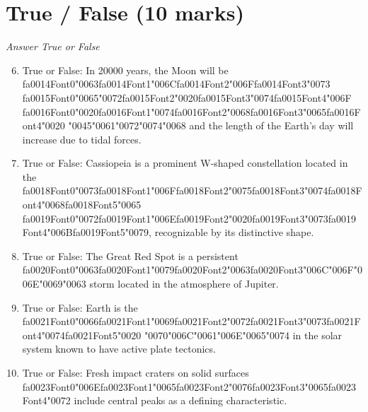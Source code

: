 \documentclass[12pt]{article}
\begin{document}
\section*{True / False (10 marks)}
\textit{Answer True or False}
\begin{enumerate}[label=\arabic*.]
\setcounter{enumi}{5}
\item True or False: In 20000 years, the Moon will be {\csname fa0014Font0\endcsname\char"0063}{\csname fa0014Font1\endcsname\char"006C}{\csname fa0014Font2\endcsname\char"006F}{\csname fa0014Font3\endcsname\char"0073} {\csname fa0015Font0\endcsname\char"0065}{\char"0072}{\csname fa0015Font2\endcsname\char"0020}{\csname fa0015Font3\endcsname\char"0074}{\csname fa0015Font4\endcsname\char"006F} {\csname fa0016Font0\endcsname\char"0020}{\csname fa0016Font1\endcsname\char"0074}{\csname fa0016Font2\endcsname\char"0068}{\csname fa0016Font3\endcsname\char"0065}{\csname fa0016Font4\endcsname\char"0020} {\char"0045}{\char"0061}{\char"0072}{\char"0074}{\char"0068} and the length of the Earth's day will increase due to tidal forces.
\item True or False: Cassiopeia is a prominent W-shaped constellation located in the {\csname fa0018Font0\endcsname\char"0073}{\csname fa0018Font1\endcsname\char"006F}{\csname fa0018Font2\endcsname\char"0075}{\csname fa0018Font3\endcsname\char"0074}{\csname fa0018Font4\endcsname\char"0068}{\csname fa0018Font5\endcsname\char"0065} {\csname fa0019Font0\endcsname\char"0072}{\csname fa0019Font1\endcsname\char"006E}{\csname fa0019Font2\endcsname\char"0020}{\csname fa0019Font3\endcsname\char"0073}{\csname fa0019Font4\endcsname\char"006B}{\csname fa0019Font5\endcsname\char"0079}, recognizable by its distinctive shape.
\item True or False: The Great Red Spot is a persistent {\csname fa0020Font0\endcsname\char"0063}{\csname fa0020Font1\endcsname\char"0079}{\csname fa0020Font2\endcsname\char"0063}{\csname fa0020Font3\endcsname\char"006C}{\char"006F}{\char"006E}{\char"0069}{\char"0063} storm located in the atmosphere of Jupiter.
\item True or False: Earth is the {\csname fa0021Font0\endcsname\char"0066}{\csname fa0021Font1\endcsname\char"0069}{\csname fa0021Font2\endcsname\char"0072}{\csname fa0021Font3\endcsname\char"0073}{\csname fa0021Font4\endcsname\char"0074}{\csname fa0021Font5\endcsname\char"0020} {\char"0070}{\char"006C}{\char"0061}{\char"006E}{\char"0065}{\char"0074} in the solar system known to have active plate tectonics.
\item True or False: Fresh impact craters on solid surfaces {\csname fa0023Font0\endcsname\char"006E}{\csname fa0023Font1\endcsname\char"0065}{\csname fa0023Font2\endcsname\char"0076}{\csname fa0023Font3\endcsname\char"0065}{\csname fa0023Font4\endcsname\char"0072} include central peaks as a defining characteristic.
\end{enumerate}
\end{document}
